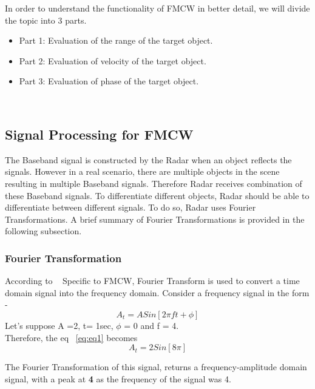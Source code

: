 In order to understand the functionality of FMCW in better detail, we will divide the topic into 3 parts.
\begin{itemize}
    \item Part 1: Evaluation of the range of the target object.
    \item Part 2: Evaluation of velocity of the target object.
    \item Part 3: Evaluation of phase of the target object.
\end{itemize}
\\

\subsection{Signal Processing for FMCW}
The Baseband signal is constructed by the Radar when an object reflects the signals. However in a real scenario, there are multiple objects in the scene resulting in multiple Baseband signals. Therefore Radar receives combination of these Baseband signals. To differentiate different objects, Radar should be able to differentiate between different signals. To do so, Radar uses Fourier Transformations. A brief summary of Fourier Transformations is provided in the following subsection.


\subsubsection{Fourier Transformation} \label{sec:FT}
According to ~\cite{FT}
Specific to FMCW, Fourier Transform is used to convert a time domain signal into the frequency domain. 
Consider a frequency signal in the form -  
\begin{equation}\label{eq:eq1}
A_{t}= ASin[2\pi ft + \phi]
\end{equation}
Let's suppose A =2, t= 1sec, \(\phi\) = 0 and f = 4.
\\
Therefore, the eq ~\ref{eq:eq1} becomes
\begin{equation}
A_{t}= 2Sin[8\pi]    
\end{equation}

The Fourier Transformation of this signal, returns a frequency-amplitude domain signal, with a peak at \textbf{4} as the frequency of the signal was 4.

